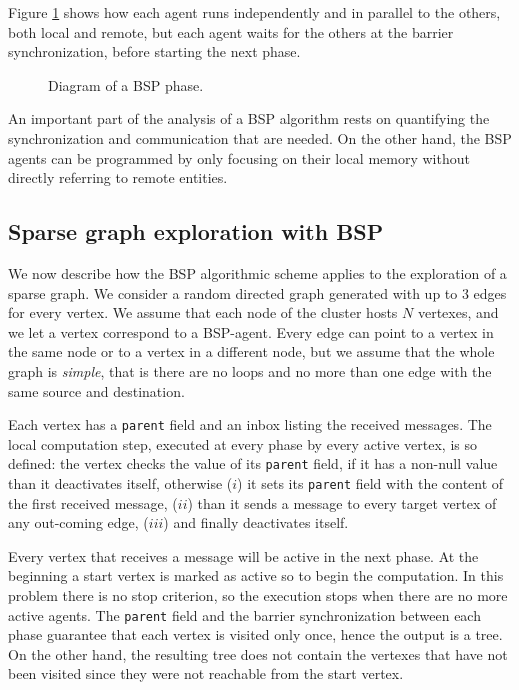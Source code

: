 \documentclass[a4paper]{article}
\numberwithin{equation}{section}
\begin{document}
Figure \ref{fig:bspDiagram} shows how each agent runs independently
and in parallel to the others, both local and remote, but each agent 
waits for the others at the 
barrier synchronization, before starting the next phase.

\begin{figure}[ht]
	\centering
	\caption{Diagram of a BSP phase.}
	\label{fig:bspDiagram}
\end{figure}

An important part of the analysis of a BSP algorithm rests on
quantifying the synchronization and communication that are needed. 
On the other hand, the BSP agents can be programmed by only focusing
on their local memory
without directly referring to remote entities.

\subsection{Sparse graph exploration with BSP}

We now describe how the BSP algorithmic scheme applies to the
exploration of a sparse graph. 
We consider a random directed graph generated with up to 3 edges for
every vertex. We assume that each node of the cluster hosts $N$
vertexes, and we let a vertex correspond to a BSP-agent. 
Every edge can point to a vertex in the same node or to a
vertex in a different node, but we assume that the whole graph
is \emph{simple}, that is there are no loops and no more than one
edge with the same source and destination.

Each vertex has a \verb+parent+ field and an inbox listing the
received messages. 
The local computation step, executed at every phase by every active
vertex, is so defined: 
the vertex checks the value of its \verb+parent+ field,
if it has a non-null value than it deactivates itself,
otherwise 
($i$) it sets its \verb+parent+ field with the content of the
first received message, 
($ii$) than it sends a message to every target vertex of any out-coming
edge, 
($iii$)	and finally deactivates itself.

Every vertex that receives a message will be active in the next phase.
At the beginning a start vertex is marked as active so to begin the
computation. In this problem there is no stop criterion, so the
execution stops when there are no more active agents.
The \verb+parent+ field and the barrier synchronization between each
phase guarantee that each vertex is visited only once, hence the
output is a tree. On the other hand, the resulting tree does not
contain the vertexes that have not been visited since they were not
reachable from the start vertex. 
\end{document}
